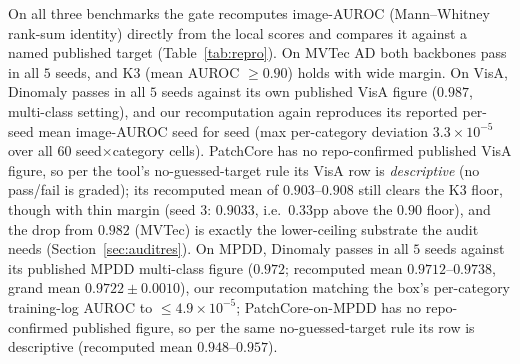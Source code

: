\documentclass[11pt]{article}
\begin{document}
On all three benchmarks the gate recomputes image-AUROC (Mann--Whitney rank-sum identity) directly
from the local scores and compares it against a named published target (Table~\ref{tab:repro}).
On MVTec AD both backbones pass in all $5$ seeds, and K3 (mean AUROC $\ge 0.90$) holds with wide
margin. On VisA, Dinomaly passes in all $5$ seeds against its own published VisA figure
($0.987$, multi-class setting), and our recomputation again reproduces its reported per-seed
mean image-AUROC seed for seed (max per-category deviation $3.3\times 10^{-5}$ over
all $60$ seed$\times$category cells). PatchCore has no repo-confirmed published VisA figure, so
per the tool's no-guessed-target rule its VisA row is \emph{descriptive} (no pass/fail is
graded); its recomputed mean of $0.903$--$0.908$ still clears the K3 floor, though with thin
margin (seed $3$: $0.9033$, i.e.\ $0.33$pp above the $0.90$ floor), and the drop from $0.982$
(MVTec) is exactly the lower-ceiling substrate the audit needs (Section~\ref{sec:auditres}). On
MPDD, Dinomaly passes in all $5$ seeds against its published MPDD multi-class figure ($0.972$;
recomputed mean $0.9712$--$0.9738$, grand mean $0.9722 \pm 0.0010$), our recomputation matching
the box's per-category training-log AUROC to $\le 4.9\times10^{-5}$; PatchCore-on-MPDD has no
repo-confirmed published figure, so per the same no-guessed-target rule its row is
descriptive (recomputed mean $0.948$--$0.957$).
\end{document}
